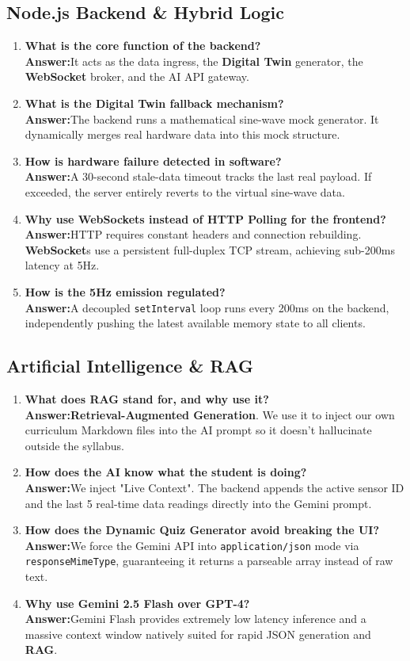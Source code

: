 \documentclass[12pt,a4paper]{article}
\newcommand{\keyword}[1]{\textcolor{keywordcolor}{\textbf{#1}}}
\newcommand{\Q}[1]{\textcolor{questioncolor}{\textbf{#1}}}
\newcommand{\A}{\textcolor{answercolor}{\textbf{Answer:}}}
\begin{document}
\subsection*{Node.js Backend \& Hybrid Logic}
\begin{enumerate}[resume]
    \item \Q{What is the core function of the backend?} \\ \A It acts as the data ingress, the \keyword{Digital Twin} generator, the \keyword{WebSocket} broker, and the AI API gateway.
    \item \Q{What is the \keyword{Digital Twin} fallback mechanism?} \\ \A The backend runs a mathematical sine-wave mock generator. It dynamically merges real hardware data into this mock structure.
    \item \Q{How is hardware failure detected in software?} \\ \A A 30-second stale-data timeout tracks the last real payload. If exceeded, the server entirely reverts to the virtual sine-wave data.
    \item \Q{Why use \keyword{WebSocket}s instead of HTTP Polling for the frontend?} \\ \A HTTP requires constant headers and connection rebuilding. \keyword{WebSocket}s use a persistent full-duplex TCP stream, achieving sub-200ms latency at 5Hz.
    \item \Q{How is the 5Hz emission regulated?} \\ \A A decoupled \texttt{setInterval} loop runs every 200ms on the backend, independently pushing the latest available memory state to all clients.
\end{enumerate}

\subsection*{Artificial Intelligence \& RAG}
\begin{enumerate}[resume]
    \item \Q{What does \keyword{RAG} stand for, and why use it?} \\ \A \keyword{Retrieval-Augmented Generation}. We use it to inject our own curriculum Markdown files into the AI prompt so it doesn't hallucinate outside the syllabus.
    \item \Q{How does the AI know what the student is doing?} \\ \A We inject "Live Context". The backend appends the active sensor ID and the last 5 real-time data readings directly into the Gemini prompt.
    \item \Q{How does the Dynamic Quiz Generator avoid breaking the UI?} \\ \A We force the Gemini API into \texttt{application/json} mode via \texttt{responseMimeType}, guaranteeing it returns a parseable array instead of raw text.
    \item \Q{Why use Gemini 2.5 Flash over GPT-4?} \\ \A Gemini Flash provides extremely low latency inference and a massive context window natively suited for rapid JSON generation and \keyword{RAG}.
\end{enumerate}
\end{document}

